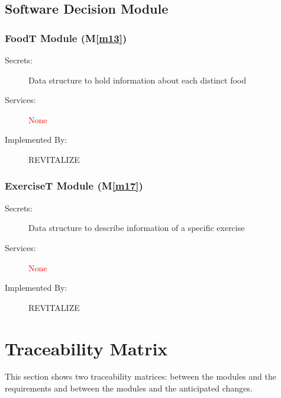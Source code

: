 \documentclass[12pt, titlepage]{article}
\newcommand{\mref}[1]{M\ref{#1}}
\begin{document}
\subsection{Software Decision Module}

\subsubsection{FoodT Module (\mref{m13})}
\begin{description}
	\item[Secrets:] Data structure to hold information about each distinct food
	\item[Services:] \textcolor{red}{None}
	\item[Implemented By:] REVITALIZE
\end{description}

\subsubsection{ExerciseT Module (\mref{m17})}
\begin{description}
	\item[Secrets:]Data structure to describe information of a specific exercise
	\item[Services:] \textcolor{red}{None}
	\item[Implemented By:] REVITALIZE
\end{description}

\section{Traceability Matrix} \label{SecTM}

This section shows two traceability matrices: between the modules and the
requirements and between the modules and the anticipated changes.
\end{document}
